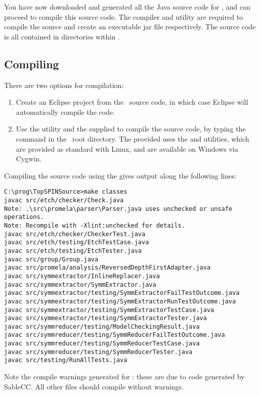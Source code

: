 You have now downloaded and generated all the Java source code for
\topspin, and can proceed to compile this source code.  The
 compiler and  utility are required to
compile the source and create an executable jar file respectively.
The source code is all contained in directories within .

\subsection{Compiling}

There are two options for compilation:

\begin{enumerate}

\item Create an Eclipse project from the \topspin\ source code, in which case
Eclipse will automatically compile the code.

\item Use the  utility and the supplied  to compile
the source code, by typing the command  in the \topspin\
root directory. The provided  uses the 
and \inline{find} utilities, which are provided as standard with
Linux, and are available on Windows via Cygwin.

\end{enumerate}
%
Compiling the source code using the  gives output
along the following lines:
%
\begin{lstlisting}
C:\prog\TopSPINSource>make classes
javac src/etch/checker/Check.java
Note: .\src\promela\parser\Parser.java uses unchecked or unsafe operations.
Note: Recompile with -Xlint:unchecked for details.
javac src/etch/checker/CheckerTest.java
javac src/etch/testing/EtchTestCase.java
javac src/etch/testing/EtchTester.java
javac src/group/Group.java
javac src/promela/analysis/ReversedDepthFirstAdapter.java
javac src/symmextractor/InlineReplacer.java
javac src/symmextractor/SymmExtractor.java
javac src/symmextractor/testing/SymmExtractorFailTestOutcome.java
javac src/symmextractor/testing/SymmExtractorRunTestOutcome.java
javac src/symmextractor/testing/SymmExtractorTestCase.java
javac src/symmextractor/testing/SymmExtractorTester.java
javac src/symmreducer/testing/ModelCheckingResult.java
javac src/symmreducer/testing/SymmReducerFailTestOutcome.java
javac src/symmreducer/testing/SymmReducerTestCase.java
javac src/symmreducer/testing/SymmReducerTester.java
javac src/testing/RunAllTests.java
\end{lstlisting}
%
Note the compile warnings generated for : these
are due to code generated by SableCC.  All other files should
compile without warnings.
%
